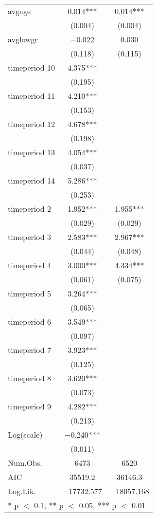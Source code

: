 \documentclass[
]{article}
\begin{document}
\begin{table}[!h]
\begin{tabular}[t]{lcc}
avgage & \num{0.014}*** & \num{0.014}***\\
 & (\num{0.004}) & (\num{0.004})\\
avglowgr & \num{-0.022} & \num{0.030}\\
 & (\num{0.118}) & (\num{0.115})\\
timeperiod 10 & \num{4.375}*** & \\
 & (\num{0.195}) & \\
timeperiod 11 & \num{4.210}*** & \\
 & (\num{0.153}) & \\
timeperiod 12 & \num{4.678}*** & \\
 & (\num{0.198}) & \\
timeperiod 13 & \num{4.054}*** & \\
 & (\num{0.037}) & \\
timeperiod 14 & \num{5.286}*** & \\
 & (\num{0.253}) & \\
timeperiod 2 & \num{1.952}*** & \num{1.955}***\\
 & (\num{0.029}) & (\num{0.029})\\
timeperiod 3 & \num{2.583}*** & \num{2.967}***\\
 & (\num{0.044}) & (\num{0.048})\\
timeperiod 4 & \num{3.000}*** & \num{4.334}***\\
 & (\num{0.061}) & (\num{0.075})\\
timeperiod 5 & \num{3.264}*** & \\
 & (\num{0.065}) & \\
timeperiod 6 & \num{3.549}*** & \\
 & (\num{0.097}) & \\
timeperiod 7 & \num{3.923}*** & \\
 & (\num{0.125}) & \\
timeperiod 8 & \num{3.620}*** & \\
 & (\num{0.073}) & \\
timeperiod 9 & \num{4.282}*** & \\
 & (\num{0.213}) & \\
Log(scale) & \num{-0.240}*** & \\
 & (\num{0.011}) & \\
\midrule
Num.Obs. & \num{6473} & \num{6520}\\
AIC & \num{35519.2} & \num{36146.3}\\
Log.Lik. & \num{-17732.577} & \num{-18057.168}\\
\bottomrule
\multicolumn{3}{l}{\rule{0pt}{1em}* p $<$ 0.1, ** p $<$ 0.05, *** p $<$ 0.01}\\
\end{tabular}
\end{table}
\end{document}
